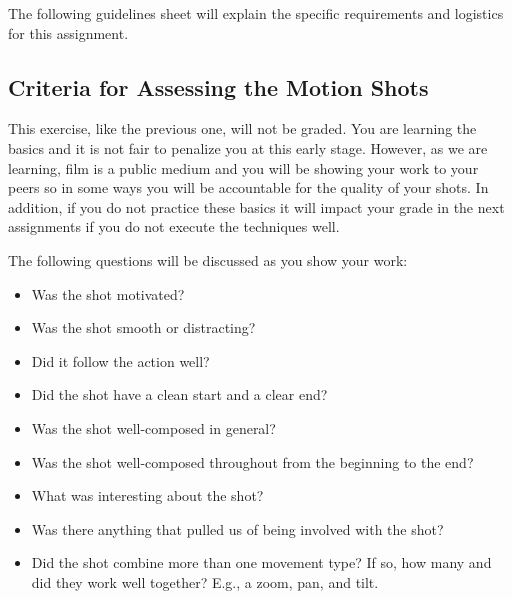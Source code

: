 \documentclass[
]{book}
\providecommand{\tightlist}{%
  \setlength{\itemsep}{0pt}\setlength{\parskip}{0pt}}
\begin{document}
\begin{assessment}
The following guidelines sheet will explain the specific requirements and logistics for this assignment.

\hypertarget{criteria-for-assessing-the-motion-shots}{%
\subsection*{Criteria for Assessing the Motion Shots}\label{criteria-for-assessing-the-motion-shots}}

This exercise, like the previous one, will not be graded. You are learning the basics and it is not fair to penalize you at this early stage. However, as we are learning, film is a public medium and you will be showing your work to your peers so in some ways you will be accountable for the quality of your shots. In addition, if you do not practice these basics it will impact your grade in the next assignments if you do not execute the techniques well.

The following questions will be discussed as you show your work:

\begin{itemize}
\tightlist
\item
  Was the shot motivated?\\
\item
  Was the shot smooth or distracting?\\
\item
  Did it follow the action well?\\
\item
  Did the shot have a clean start and a clear end?\\
\item
  Was the shot well-composed in general?\\
\item
  Was the shot well-composed throughout from the beginning to the end?\\
\item
  What was interesting about the shot?\\
\item
  Was there anything that pulled us of being involved with the shot?\\
\item
  Did the shot combine more than one movement type? If so, how many and did they work well together? E.g., a zoom, pan, and tilt.
\end{itemize}


\end{assessment}
\end{document}
